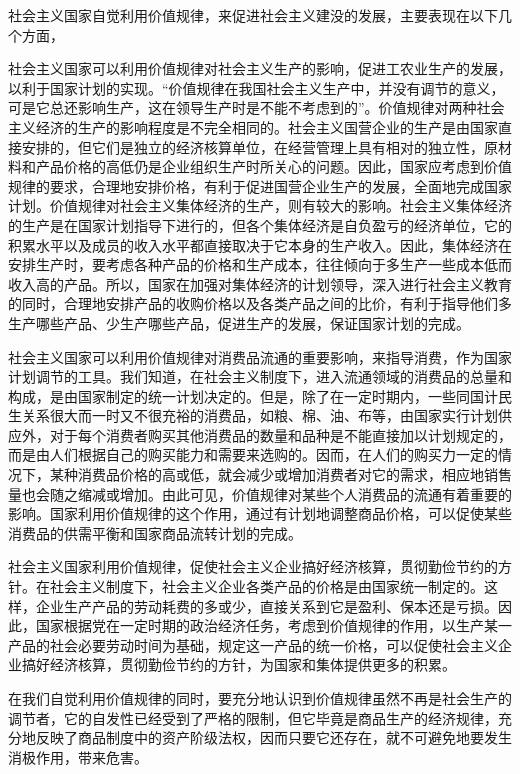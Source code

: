 \documentclass{book}
\begin{document}
社会主义国家自觉利用价值规律，来促进社会主义建没的发展，主要表现在以下几个方面，

社会主义国家可以利用价值规律对社会主义生产的影响，促进工农业生产的发展，以利于国家计划的实现。“价值规律在我国社会主义生产中，并没有调节的意义，可是它总还影响生产，这在领导生产时是不能不考虑到的”。价值规律对两种社会主义经济的生产的影响程度是不完全相同的。社会主义国营企业的生产是由国家直接安排的，但它们是独立的经济核算单位，在经营管理上具有相对的独立性，原材料和产品价格的高低仍是企业组织生产时所关心的问题。因此，国家应考虑到价值规律的要求，合理地安排价格，有利于促进国营企业生产的发展，全面地完成国家计划。价值规律对社会主义集体经济的生产，则有较大的影响。社会主义集体经济的生产是在国家计划指导下进行的，但各个集体经济是自负盈亏的经济单位，它的积累水平以及成员的收入水平都直接取决于它本身的生产收入。因此，集体经济在安排生产时，要考虑各种产品的价格和生产成本，往往倾向于多生产一些成本低而收入高的产品。所以，国家在加强对集体经济的计划领导，深入进行社会主义教育的同时，合理地安排产品的收购价格以及各类产品之间的比价，有利于指导他们多生产哪些产品、少生产哪些产品，促进生产的发展，保证国家计划的完成。

社会主义国家可以利用价值规律对消费品流通的重要影响，来指导消费，作为国家计划调节的工具。我们知道，在社会主义制度下，进入流通领域的消费品的总量和构成，是由国家制定的统一计划决定的。但是，除了在一定时期内，一些同国计民生关系很大而一时又不很充裕的消费品，如粮、棉、油、布等，由国家实行计划供应外，对于每个消费者购买其他消费品的数量和品种是不能直接加以计划规定的，而是由人们根据自己的购买能力和需要来选购的。因而，在人们的购买力一定的情况下，某种消费品价格的高或低，就会减少或增加消费者对它的需求，相应地销售量也会随之缩减或增加。由此可见，价值规律对某些个人消费品的流通有着重要的影响。国家利用价值规律的这个作用，通过有计划地调整商品价格，可以促使某些消费品的供需平衡和国家商品流转计划的完成。

社会主义国家利用价值规律，促使社会主义企业搞好经济核算，贯彻勤俭节约的方针。在社会主义制度下，社会主义企业各类产品的价格是由国家统一制定的。这样，企业生产产品的劳动耗费的多或少，直接关系到它是盈利、保本还是亏损。因此，国家根据党在一定时期的政治经济任务，考虑到价值规律的作用，以生产某一产品的社会必要劳动时间为基础，规定这一产品的统一价格，可以促使社会主义企业搞好经济核算，贯彻勤俭节约的方针，为国家和集体提供更多的积累。

在我们自觉利用价值规律的同时，要充分地认识到价值规律虽然不再是社会生产的调节者，它的自发性已经受到了严格的限制，但它毕竟是商品生产的经济规律，充分地反映了商品制度中的资产阶级法权，因而只要它还存在，就不可避免地要发生消极作用，带来危害。
\end{document}
